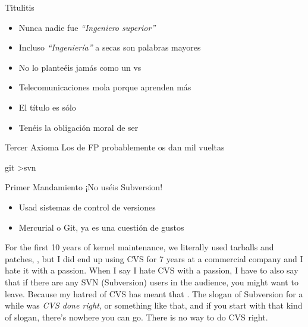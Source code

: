 \documentclass[14pt]{beamer}
\newcommand{\WebLink}[2]{
  \href{#1}{\structure{\PointingHand~\color{sail-green}{#2}}}
}
\begin{document}
\begin{frame}{Titulitis}
  \begin{itemize}
    \item Nunca nadie fue \emph{``Ingeniero superior''}
    \item Incluso \emph{``Ingeniería''} a secas son palabras mayores
    \item No lo planteéis jamás como un  vs
    \item Telecomunicaciones mola porque aprenden más 
    \item El título es sólo 
    \item Tenéis la obligación moral de ser 
  \end{itemize}

  \begin{alertblock}{\centering Tercer Axioma}
    \centering Los de FP probablemente os dan mil vueltas
  \end{alertblock}
\end{frame}



\begin{frame}{git \textgreater svn}

  \begin{alertblock}{\centering Primer Mandamiento}
    \centering ¡No uséis Subversion!
  \end{alertblock}

  \begin{itemize} \itemsep0em
    \item Usad sistemas de control de versiones 
    \item Mercurial o Git, ya es una cuestión de gustos
  \end{itemize}

  \begin{block}{}\centering
    \scriptsize For the first 10 years of kernel maintenance, we
    literally used tarballs and patches, , but I
    did end up using CVS for 7 years at a commercial company and I
    hate it with a passion. When I say I hate CVS with a passion, I
    have to also say that if there are any SVN (Subversion) users in
    the audience, you might want to leave. Because my hatred of CVS
    has meant that . The slogan of Subversion for a
    while was \emph{CVS done right}, or something like that, and if
    you start with that kind of slogan, there's nowhere you can
    go. There is no way to do CVS right.
  \end{block}

  \vspace{-0.5cm}

  \begin{center}
    \WebLink{https://www.youtube.com/watch?v=4XpnKHJAok8}
            {\small Linus Torvalds on Git (2007)}
  \end{center}
\end{frame}
\end{document}

